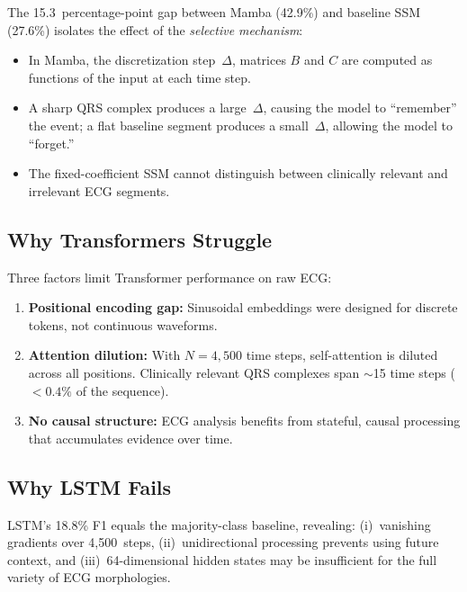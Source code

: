 \documentclass[runningheads]{llncs}
\begin{document}
The 15.3~percentage-point gap between Mamba (42.9\%) and baseline SSM
(27.6\%) isolates the effect of the \textit{selective mechanism}:

\begin{itemize}
    \item In Mamba, the discretization step~$\Delta$, matrices $B$ and $C$ are
          computed as functions of the input at each time step.
    \item A sharp QRS complex produces a large~$\Delta$, causing the model to
          ``remember'' the event; a flat baseline segment produces a
          small~$\Delta$, allowing the model to ``forget.''
    \item The fixed-coefficient SSM cannot distinguish between clinically
          relevant and irrelevant ECG segments.
\end{itemize}

\subsection{Why Transformers Struggle}

Three factors limit Transformer performance on raw ECG:
\begin{enumerate}
    \item \textbf{Positional encoding gap:} Sinusoidal embeddings were designed
          for discrete tokens, not continuous waveforms.
    \item \textbf{Attention dilution:} With $N{=}4{,}500$ time steps,
          self-attention is diluted across all positions. Clinically relevant
          QRS complexes span $\sim$15 time steps ($<0.4\%$ of the sequence).
    \item \textbf{No causal structure:} ECG analysis benefits from stateful,
          causal processing that accumulates evidence over time.
\end{enumerate}

\subsection{Why LSTM Fails}

LSTM's 18.8\% F1 equals the majority-class baseline, revealing: (i)~vanishing
gradients over 4,500~steps, (ii)~unidirectional processing prevents using
future context, and (iii)~64-dimensional hidden states may be insufficient for
the full variety of ECG morphologies.


\end{document}
